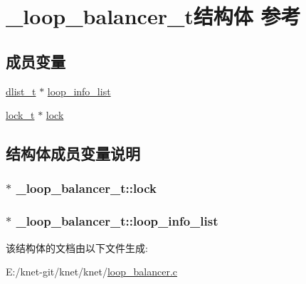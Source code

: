 \hypertarget{a00022}{}\section{\+\_\+loop\+\_\+balancer\+\_\+t结构体 参考}
\label{a00022}
\subsection*{成员变量}
\begin{DoxyCompactItemize}
\item 
\hyperlink{a00044_ad6644d67df4b4e3596c1eb12977d1d16_ad6644d67df4b4e3596c1eb12977d1d16}{dlist\+\_\+t} $\ast$ \hyperlink{a00022_a31f3e441c9d044bab51586436d64ec2c_a31f3e441c9d044bab51586436d64ec2c}{loop\+\_\+info\+\_\+list}
\item 
\hyperlink{a00044_ad3e00e0eb0c79dfd77ff2ff833f49c7d_ad3e00e0eb0c79dfd77ff2ff833f49c7d}{lock\+\_\+t} $\ast$ \hyperlink{a00022_ac373919d2691e1c10a452f3ef68d124c_ac373919d2691e1c10a452f3ef68d124c}{lock}
\end{DoxyCompactItemize}


\subsection{结构体成员变量说明}
\hypertarget{a00022_ac373919d2691e1c10a452f3ef68d124c_ac373919d2691e1c10a452f3ef68d124c}{}
\subsubsection[{lock}]{$\ast$ \+\_\+loop\+\_\+balancer\+\_\+t\+::lock}\label{a00022_ac373919d2691e1c10a452f3ef68d124c_ac373919d2691e1c10a452f3ef68d124c}
\hypertarget{a00022_a31f3e441c9d044bab51586436d64ec2c_a31f3e441c9d044bab51586436d64ec2c}{}
\subsubsection[{loop\+\_\+info\+\_\+list}]{$\ast$ \+\_\+loop\+\_\+balancer\+\_\+t\+::loop\+\_\+info\+\_\+list}\label{a00022_a31f3e441c9d044bab51586436d64ec2c_a31f3e441c9d044bab51586436d64ec2c}


该结构体的文档由以下文件生成\+:\begin{DoxyCompactItemize}
\item 
E\+:/knet-\/git/knet/knet/\hyperlink{a00055}{loop\+\_\+balancer.\+c}\end{DoxyCompactItemize}
